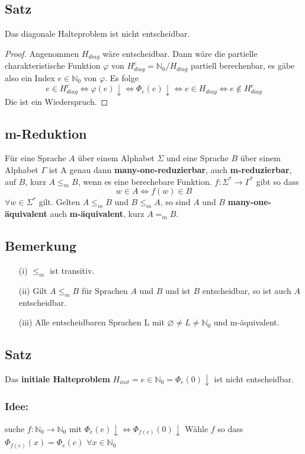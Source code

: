 \subsection{Satz} Das diagonale Halteproblem ist nicht entscheidbar. 
\begin{proof}
  Angenommen $H_{diag}$ wäre entscheidbar. Dann wäre die partielle charakteristische Funktion $\varphi$ von $H_{diag}^c = \mathbb{N}_0 / H_{diag}$ partiell berechenbar, es gäbe also ein Index $e \in \mathbb{N}_0$ von $\varphi$. Es folge \[e \in H_{diag}^c \Leftrightarrow \varphi(e) \downarrow \Leftrightarrow \Phi_e(e) \downarrow \Leftrightarrow e \in H_{diag} \Leftrightarrow e \not \in H_{diag}^c\] Die ist ein Wiederspruch.
\end{proof}

\subsection{m-Reduktion} Für eine Sprache $A$ über einem Alphabet $\Sigma$ und eine Sprache $B$ über einem Alphabet $\Gamma$ ist A genau dann \textbf{many-one-reduzierbar}, auch \textbf{m-reduzierbar}, auf $B$, kurz $A \leq_m B$, wenn es eine berechebare Funktion. $f: \Sigma^* \to \Gamma^*$ gibt so dass \[w \in A \Leftrightarrow f(w)\in B\] $\forall w \in \Sigma^*$ gilt. Gelten $A \leq_m B$ und $B \leq_{m} A$, so sind $A$ und $B$ \textbf{many-one-äquivalent} auch \textbf{m-äquivalent}, kurz $A =_m B$.

\subsection{Bemerkung} 
\begin{itemize}
  \item [(i)] $\leq_m$ ist transitiv.
  \item [(ii)] Gilt $A \leq_m B$ für Sprachen $A$ und $B$ und ist $B$ entscheidbar, so ist auch $A$ entscheidbar.
  \item [(iii)] Alle entscheidbaren Sprachen L mit $\varnothing \not = L \not = \mathbb{N}_0$ und m-äquivalent.
\end{itemize}

\subsection{Satz} Das \textbf{initiale Halteproblem} $H_{init} = {e \in \mathbb{N}_0 = \Phi_e(0) \downarrow}$ ist nicht entscheidbar.

\subsubsection*{Idee: } suche $f:\mathbb{N}_0 \to \mathbb{N}_0$ mit $\Phi_e(e)\downarrow \Leftrightarrow \Phi_{f(e)}(0)\downarrow$ Wähle $f$ so dass $\Phi_{f(e)}(x) = \Phi_e(e)$ $\forall x \in \mathbb{N}_0$

